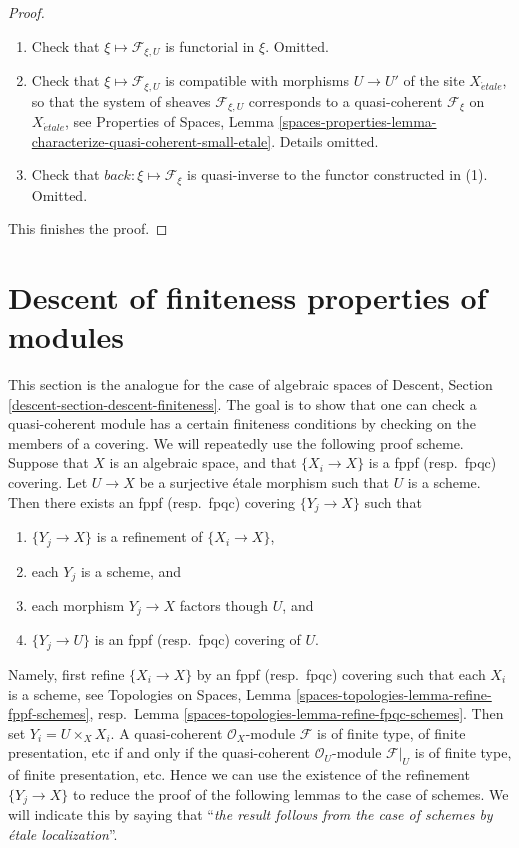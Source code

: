 \begin{proof}
\begin{enumerate}
\item Check that $\xi \mapsto \mathcal{F}_{\xi, U}$ is functorial in $\xi$.
Omitted.
\item Check that $\xi \mapsto \mathcal{F}_{\xi, U}$ is compatible
with morphisms $U \to U'$ of the site $X_{\acute{e}tale}$, so that
the system of sheaves $\mathcal{F}_{\xi, U}$ corresponds to a quasi-coherent
$\mathcal{F}_\xi$ on $X_{\acute{e}tale}$, see
Properties of Spaces,
Lemma \ref{spaces-properties-lemma-characterize-quasi-coherent-small-etale}.
Details omitted.
\item Check that $back : \xi \mapsto \mathcal{F}_\xi$ is quasi-inverse
to the functor constructed in (1). Omitted.
\end{enumerate}
This finishes the proof.
\end{proof}





\section{Descent of finiteness properties of modules}
\label{section-descent-finiteness}

\noindent
This section is the analogue for the case of algebraic spaces of
Descent, Section \ref{descent-section-descent-finiteness}.
The goal is to show that one can check a quasi-coherent module
has a certain finiteness conditions by checking on the members of
a covering. We will repeatedly use the following proof scheme.
Suppose that $X$ is an algebraic space, and that $\{X_i \to X\}$
is a fppf (resp.\ fpqc) covering. Let $U \to X$ be a surjective
\'etale morphism such that $U$ is a scheme. Then there exists an
fppf (resp.\ fpqc) covering $\{Y_j \to X\}$ such that
\begin{enumerate}
\item $\{Y_j \to X\}$ is a refinement of $\{X_i \to X\}$,
\item each $Y_j$ is a scheme, and
\item each morphism $Y_j \to X$ factors though $U$, and
\item $\{Y_j \to U\}$ is an fppf (resp.\ fpqc) covering of $U$.
\end{enumerate}
Namely, first refine $\{X_i \to X\}$ by an fppf (resp.\ fpqc)
covering such that each $X_i$ is a scheme, see
Topologies on Spaces, Lemma \ref{spaces-topologies-lemma-refine-fppf-schemes},
resp.\ Lemma \ref{spaces-topologies-lemma-refine-fpqc-schemes}.
Then set $Y_i = U \times_X X_i$. A quasi-coherent
$\mathcal{O}_X$-module $\mathcal{F}$ is of finite type, of
finite presentation, etc if and only if the quasi-coherent
$\mathcal{O}_U$-module $\mathcal{F}|_U$ is of finite type, of
finite presentation, etc. Hence we can use the existence of the
refinement $\{Y_j \to X\}$ to reduce the proof of the following
lemmas to the case of schemes. We will indicate this by saying
that ``{\it the result follows from the case of schemes by
\'etale localization}''.

